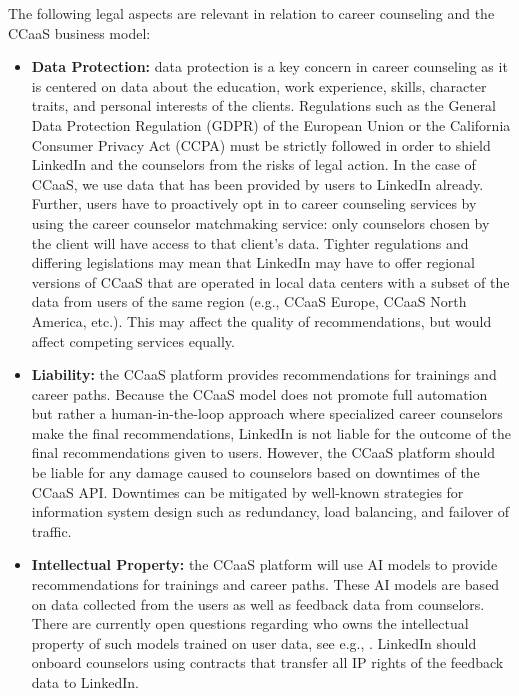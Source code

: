 The following legal aspects are relevant in relation to career counseling and the CCaaS business model:

\begin{itemize}
    \item \textbf{Data Protection:} data protection is a key concern in career counseling as it is 
        centered on data about the education, work experience, skills, character traits, and personal 
        interests of the clients. Regulations such as the General Data Protection Regulation (GDPR) of
        the European Union \citep{europeanparliamentRegulationEU20162016} or the California Consumer
        Privacy Act (CCPA) \citep{californiastatelegislatureTitle81California2018} must be strictly followed
        in order to shield LinkedIn and the counselors from the risks of legal action. In the case of 
        CCaaS, we use data that has been provided by users to LinkedIn already. Further, users have to
        proactively opt in to career counseling services by using the career counselor matchmaking service:
        only counselors chosen by the client will have access to that client's data.
        Tighter regulations and differing legislations may mean that LinkedIn may have to offer regional
        versions of CCaaS that are operated in local data centers with a subset of the data from users of
        the same region (e.g., CCaaS Europe, CCaaS North America, etc.). This may affect the quality of 
        recommendations, but would affect competing services equally.
    \item \textbf{Liability:} the CCaaS platform provides recommendations for trainings and career
        paths. Because the CCaaS model does not promote full automation but rather a human-in-the-loop
        approach where specialized career counselors make the final recommendations, LinkedIn is not 
        liable for the outcome of the final recommendations given to users. However, the CCaaS platform
        should be liable for any damage caused to counselors based on downtimes of the CCaaS API. Downtimes 
        can be mitigated by well-known strategies for information system design such as redundancy, load
        balancing, and failover of traffic.
    \item \textbf{Intellectual Property:} the CCaaS platform will use AI models to provide
        recommendations for trainings and career paths. These AI models are based on data collected
        from the users as well as feedback data from counselors. There are currently open questions
        regarding who owns the intellectual property of such models trained on user data, see e.g.,
        \citep{anwerIPChallengesDatafueled2021}. LinkedIn should onboard counselors using contracts 
        that transfer all IP rights of the feedback data to LinkedIn.
\end{itemize}


